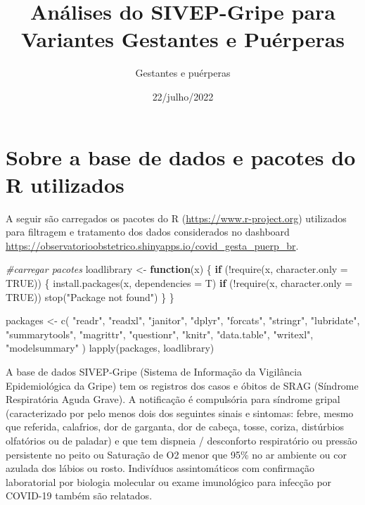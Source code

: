 \documentclass[
]{article}
\title{Análises do SIVEP-Gripe para Variantes Gestantes e Puérperas}
\author{Gestantes e puérperas}
\date{22/julho/2022}
\newenvironment{Shaded}{\begin{snugshade}}{\end{snugshade}}
\newcommand{\AttributeTok}[1]{\textcolor[rgb]{0.77,0.63,0.00}{#1}}
\newcommand{\CommentTok}[1]{\textcolor[rgb]{0.56,0.35,0.01}{\textit{#1}}}
\newcommand{\ConstantTok}[1]{\textcolor[rgb]{0.00,0.00,0.00}{#1}}
\newcommand{\ControlFlowTok}[1]{\textcolor[rgb]{0.13,0.29,0.53}{\textbf{#1}}}
\newcommand{\FunctionTok}[1]{\textcolor[rgb]{0.00,0.00,0.00}{#1}}
\newcommand{\NormalTok}[1]{#1}
\newcommand{\OtherTok}[1]{\textcolor[rgb]{0.56,0.35,0.01}{#1}}
\newcommand{\SpecialCharTok}[1]{\textcolor[rgb]{0.00,0.00,0.00}{#1}}
\newcommand{\StringTok}[1]{\textcolor[rgb]{0.31,0.60,0.02}{#1}}
\begin{document}
\maketitle

\hypertarget{sobre-a-base-de-dados-e-pacotes-do-r-utilizados}{%
\section{Sobre a base de dados e pacotes do R
utilizados}\label{sobre-a-base-de-dados-e-pacotes-do-r-utilizados}}

A seguir são carregados os pacotes do R
(\url{https://www.r-project.org}) utilizados para filtragem e tratamento
dos dados considerados no dashboard
\url{https://observatorioobstetrico.shinyapps.io/covid_gesta_puerp_br}.

\begin{Shaded}
\begin{Highlighting}[]
\CommentTok{\#carregar pacotes}
\NormalTok{loadlibrary }\OtherTok{\textless{}{-}} \ControlFlowTok{function}\NormalTok{(x) \{}
  \ControlFlowTok{if}\NormalTok{ (}\SpecialCharTok{!}\FunctionTok{require}\NormalTok{(x, }\AttributeTok{character.only =} \ConstantTok{TRUE}\NormalTok{)) \{}
    \FunctionTok{install.packages}\NormalTok{(x, }\AttributeTok{dependencies =}\NormalTok{ T)}
    \ControlFlowTok{if}\NormalTok{ (}\SpecialCharTok{!}\FunctionTok{require}\NormalTok{(x, }\AttributeTok{character.only =} \ConstantTok{TRUE}\NormalTok{))}
      \FunctionTok{stop}\NormalTok{(}\StringTok{"Package not found"}\NormalTok{)}
\NormalTok{  \}}
\NormalTok{\}}

\NormalTok{packages }\OtherTok{\textless{}{-}}
  \FunctionTok{c}\NormalTok{(}
    \StringTok{"readr"}\NormalTok{,}
    \StringTok{"readxl"}\NormalTok{,}
    \StringTok{"janitor"}\NormalTok{,}
    \StringTok{"dplyr"}\NormalTok{,}
    \StringTok{"forcats"}\NormalTok{,}
    \StringTok{"stringr"}\NormalTok{,}
    \StringTok{"lubridate"}\NormalTok{,}
    \StringTok{"summarytools"}\NormalTok{,}
    \StringTok{"magrittr"}\NormalTok{,}
    \StringTok{"questionr"}\NormalTok{,}
    \StringTok{"knitr"}\NormalTok{,}
    \StringTok{"data.table"}\NormalTok{,}
    \StringTok{"writexl"}\NormalTok{,}
    \StringTok{"modelsummary"}
\NormalTok{  )}
\FunctionTok{lapply}\NormalTok{(packages, loadlibrary)}
\end{Highlighting}
\end{Shaded}

A base de dados SIVEP-Gripe (Sistema de Informação da Vigilância
Epidemiológica da Gripe) tem os registros dos casos e óbitos de SRAG
(Síndrome Respiratória Aguda Grave). A notificação é compulsória para
síndrome gripal (caracterizado por pelo menos dois dos seguintes sinais
e sintomas: febre, mesmo que referida, calafrios, dor de garganta, dor
de cabeça, tosse, coriza, distúrbios olfatórios ou de paladar) e que tem
dispneia / desconforto respiratório ou pressão persistente no peito ou
Saturação de O2 menor que 95\% no ar ambiente ou cor azulada dos lábios
ou rosto. Indivíduos assintomáticos com confirmação laboratorial por
biologia molecular ou exame imunológico para infecção por COVID-19
também são relatados.
\end{document}
